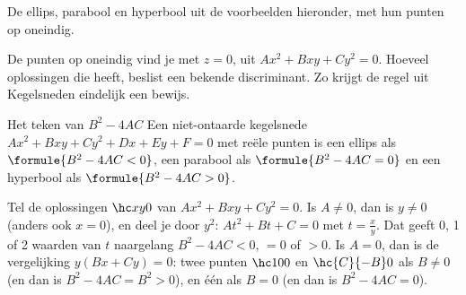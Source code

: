 \begin{center}\small De ellips, parabool en hyperbool uit de voorbeelden hieronder, met hun punten op oneindig.\end{center}

De punten op oneindig vind je met $z = 0$, uit $Ax^2 + Bxy + Cy^2 = 0$. Hoeveel oplossingen die heeft, beslist een bekende discriminant. Zo krijgt de regel uit Kegelsneden eindelijk een bewijs.

\begin{theorie}
\begin{stelling}{Het teken van \texorpdfstring{$B^2 - 4AC$}{B2 - 4AC}}
Een niet-ontaarde kegelsnede $Ax^2 + Bxy + Cy^2 + Dx + Ey + F = 0$ met reële punten is een ellips als $\formule{B^2 - 4AC < 0}$, een parabool als $\formule{B^2 - 4AC = 0}$ en een hyperbool als $\formule{B^2 - 4AC > 0}$.
\end{stelling}

\begin{bewijs}
Tel de oplossingen $\hc xy0$ van $Ax^2 + Bxy + Cy^2 = 0$. Is $A \neq 0$, dan is $y \neq 0$ (anders ook $x = 0$), en deel je door $y^2$: $At^2 + Bt + C = 0$ met $t = \tfrac xy$. Dat geeft 0, 1 of 2 waarden van $t$ naargelang $B^2 - 4AC < 0$, $= 0$ of $> 0$. Is $A = 0$, dan is de vergelijking $y(Bx + Cy) = 0$: twee punten $\hc100$ en $\hc{C}{-B}0$ als $B \neq 0$ (en dan is $B^2 - 4AC = B^2 > 0$), en één als $B = 0$ (en dan is $B^2 - 4AC = 0$).
\end{bewijs}
\end{theorie}

